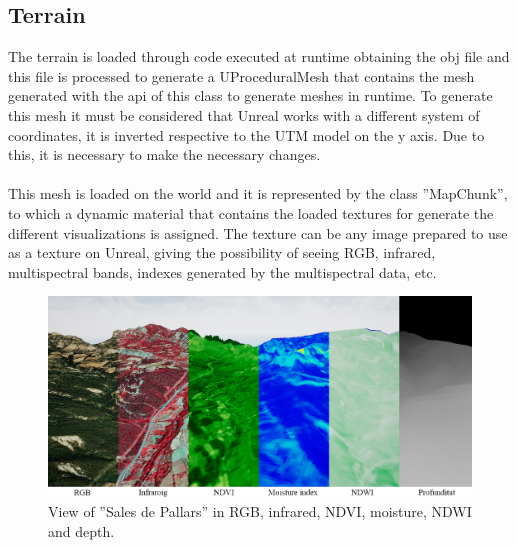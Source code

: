\documentclass[10pt,a4paper,twocolumn,twoside]{article}
\begin{document}
\subsection{Terrain}
The terrain is loaded through code executed at runtime obtaining the obj file and this file is processed to generate a UProceduralMesh\cite{uprocedural} that contains the mesh generated with the api of this class to generate meshes in runtime. To generate this mesh it must be considered that Unreal works with a different system of coordinates, it is inverted respective to the UTM model on the y axis. Due to this, it is necessary to make the necessary changes.
\\
\\
This mesh is loaded on the world and it is represented by the class ''MapChunk'', to which a dynamic material that contains the loaded textures for generate the different visualizations is assigned. The texture can be any image prepared to use as a texture on Unreal, giving the possibility of seeing RGB, infrared, multispectral bands, indexes generated by the multispectral data, etc.

\begin{figure}[!h]
\centering
  	\includegraphics[width=1\textwidth]{multispectral/spectralindexes}
	\caption{View of ''Sales de Pallars'' in RGB, infrared, NDVI, moisture, NDWI and depth.}
	\label{fig-spectralindexes}
\end{figure}
\end{document}
